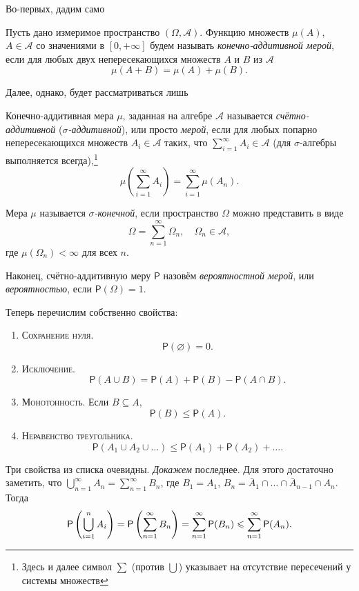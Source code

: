 Во-первых, дадим само 
\begin{definition}
	Пусть дано измеримое пространство $ (\Omega, \mathscr A) $. Функцию множеств
	$ \mu(A) $, $ A \in \mathscr A $ со значениями в $ [0, +\infty] $ будем называть \emph{конечно-аддитивной
	мерой}, если для любых двух непересекающихся множеств $ A $ и $ B $ из $
	\mathscr A $ 
	\[
			\mu(A+B) = \mu(A) + \mu(B).
  \]
\end{definition}
\noindent Далее, однако, будет рассматриваться лишь
	\begin{definition}
	Конечно-аддитивная мера $ \mu $, заданная на алгебре $ \mathscr A $ называется
	\emph{счётно-аддитивной} (\emph{$ \sigma $-аддитивной}), или просто
	\emph{мерой}, если для любых попарно непересекающихся множеств $ A_i \in
	\mathscr A $ таких, что $ \sum\limits_{i=1}^\infty A_i \in \mathscr A $ (для
	$ \sigma $-алгебры выполняется всегда),\footnote{Здесь и далее символ $ \sum $
		(против $ \bigcup $)
	указывает на отсутствие пересечений у системы множеств}
	\[
		\mu \left( \sum_{i=1}^\infty A_i \right) = \sum_{i=1}^\infty \mu(A_n).
	\]
	
	Мера $ \mu $ называется \emph{$ \sigma $-конечной}, если пространство $ \Omega
	$ можно представить в виде 
	\[
		\Omega = \sum_{n=1}^\infty \Omega_n, \quad \Omega_n \in \mathscr A,
	\]
	где $ \mu(\Omega_n) < \infty $ для всех $ n $.

	Наконец, счётно-аддитивную меру $ \mathsf P $ назовём \emph{вероятностной
	мерой}, или \emph{вероятностью}, если $ \mathsf P(\Omega) = 1 $.
	\end{definition}
	
	Теперь перечислим собственно свойства:
	\begin{enumerate}
		\item \textsc{Сохранение нуля}.
			\[
				\mathsf P (\varnothing) = 0.
			\]
		\item \textsc{Исключение}. 
		\[
				\mathsf P(A \cup B) = \mathsf P(A) + \mathsf P(B) - \mathsf P(A\cap B).
		\]
	\item \textsc{Монотонность}. Если $ B \subseteq A $,
	\[
			\mathsf P(B) \leqslant \mathsf P(A).
	\]
\item \textsc{Неравенство треугольника}.  
\[
		\mathsf P(A_1 \cup A_2 \cup \ldots) \leqslant \mathsf P(A_1) +
		\mathsf P(A_2) + \ldots.
\]
\end{enumerate}
Три свойства из списка очевидны. \emph{Докажем} последнее. Для этого достаточно
заметить, что $ \bigcup_{n=1}^\infty A_n = \sum_{n=1}^\infty B_n $, где $ B_1 =
A_1$, $ B_n = \bar A_1 \cap \ldots \cap \bar A_{n-1} \cap A_n $. Тогда 
\[
	\mathsf P \left( \bigcup_{i=1}^n A_i \right) = \mathsf P \left( \sum_{n=1}^\infty
	B_n\right) = \sum_{n=1}^\infty \mathsf P(B_n) \leqslant \sum_{n=1}^\infty
	\mathsf P(A_n).
\]



